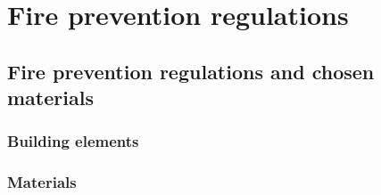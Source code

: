 \chapter{Fire prevention regulations}

	\section{Fire prevention regulations and chosen materials}
		\subsection{Building elements}
		\subsection{Materials}